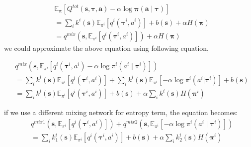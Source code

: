 \documentclass[runningheads]{llncs}
\begin{document}
\begin{equation}
	\begin{aligned}
		&\mathbb{E}_{\boldsymbol{\pi}}\left[Q^{t o t}(\boldsymbol{s},\boldsymbol{\tau}, \boldsymbol{a}) -\alpha \log \boldsymbol{\pi} \left(\boldsymbol{a} \mid \boldsymbol{\tau} \right) \right]\\
		&=\sum_{i} k^{i}(\boldsymbol{s}) \mathbb{E}_{{\pi}^{i}} \left[ q^{i}\left(\boldsymbol{\tau}^{i}, a^{i}\right)\right]+ b(\boldsymbol{s})+ \alpha  H(\boldsymbol{\pi}) \\
		&=q^{mix}(\boldsymbol{s},\mathbb{E}_{{\pi}^{i}} \left[ q^{i}\left(\boldsymbol{\tau}^{i}, a^{i}\right)\right])+ \alpha H(\boldsymbol{\pi})
	\end{aligned}
\end{equation}
we could approximate the above equation using following equation,

\begin{equation}
	\begin{aligned}
		&q^{mix}(\boldsymbol{s},\mathbb{E}_{{\pi}^{i}} \left[ q^{i}\left(\boldsymbol{\tau}^{i}, a^{i}\right)  -\alpha \log {\pi}^{i} \left({a^i} \mid \boldsymbol{\tau}^i \right) \right])\\
		&=\sum_{i} k^{i}(\boldsymbol{s}) \mathbb{E}_{{\pi}^{i}} \left[ q^{i}\left(\boldsymbol{\tau}^{i}, a^{i}\right)\right]+
		\sum_{i} k^{i}(\boldsymbol{s}) \mathbb{E}_{{\pi}^{i}} \left[- \alpha \log \pi^{i}\left(a^{i} | \boldsymbol{\tau}^{i}\right)\right]
		+b(\boldsymbol{s})\\
		&=\sum_{i} k^{i}(\boldsymbol{s}) \mathbb{E}_{{\pi}^{i}} \left[ q^{i}\left(\boldsymbol{\tau}^{i}, a^{i}\right)\right]+ b(\boldsymbol{s})+ \alpha \sum_{i} k^{i}(\boldsymbol{s}) H(\boldsymbol{\pi}^i) 
	\end{aligned}
\end{equation}


if we use a different mixing network for entropy term, the equation becomes:
\begin{equation}
	\begin{aligned}
		&q^{mix1}(\boldsymbol{s},\mathbb{E}_{{\pi}^{i}} \left[ q^{i}\left(\boldsymbol{\tau}^{i}, a^{i}\right)  \right]) + q^{mix2}(\boldsymbol{s},\mathbb{E}_{{\pi}^{i}} \left[-\alpha \log {\pi}^{i} \left({a^i} \mid \boldsymbol{\tau}^i \right) \right])\\
		&=\sum_{i} k^{i}_{1}(\boldsymbol{s}) \mathbb{E}_{{\pi}^{i}} \left[ q^{i}\left(\boldsymbol{\tau}^{i}, a^{i}\right)\right]+ b(\boldsymbol{s})+ \alpha \sum_{i} k^{i}_{2}(\boldsymbol{s}) H(\boldsymbol{\pi}^i) 
	\end{aligned}
\end{equation}



\vspace{12pt}
\end{document}
